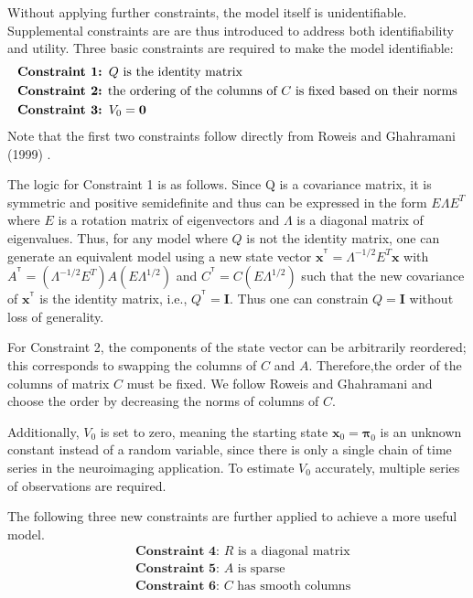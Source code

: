 \documentclass[fleqn]{article}
\newcommand{\T}{^{\ensuremath{\mathsf{T}}}}           %
\providecommand{\mb}[1]{\boldsymbol{#1}}
\newcommand{\bx}{\mb{x}}
\begin{document}
Without applying further constraints, the model itself is unidentifiable. Supplemental constraints are are thus introduced to address both identifiability and utility. Three basic constraints are required to make the model identifiable:
\vspace*{-3mm}
\begin{equation*}\label{eq:constraints1}
\begin{aligned}
&\textbf{Constraint 1: }Q \text{ is the identity matrix}\\
&\text{\textbf{Constraint 2:} the ordering of the columns of } C \text{ is fixed based on their norms}\\
&\textbf{Constraint 3: } V_0=\mathbf{0}
\end{aligned}
\end{equation*}
Note that the first two constraints follow directly from Roweis and Ghahramani (1999) \cite{roweis1999unifying}.

The logic for Constraint 1 is as follows. Since Q is a covariance matrix, it is symmetric and positive semidefinite and thus can be expressed in the form $E\Lambda E^T$ where $E$ is a rotation matrix of eigenvectors and $\Lambda$ is a diagonal matrix of eigenvalues. Thus, for any model where $Q$ is not the identity matrix, one can generate an equivalent model using a new state vector $\bx^{\T}=\Lambda^{-1/2} E^T \bx$ with $A^{\T}=(\Lambda^{-1/2}E^T)A(E\Lambda^{1/2})$ and $C^{\T}=C(E\Lambda^{1/2})$ such that the new covariance of $\bx^{\T}$ is the identity matrix, i.e., $Q^{\T}=\mathbf{I}$. Thus one can constrain $Q=\mathbf{I}$ without loss of generality.

For Constraint 2, the components of the state vector can be arbitrarily reordered; this corresponds to swapping the columns of $C$ and $A$. Therefore,the order of the columns of matrix $C$ must be fixed. We follow Roweis and Ghahramani and choose the order by decreasing the norms of columns of $C$.

Additionally, $V_0$ is set to zero, meaning the starting state $\bx_0=\mathbf{\pi}_0$ is an unknown constant instead of a random variable, since there is only a single chain of time series in the neuroimaging application. To estimate $V_0$ accurately, multiple series of observations are required.

The following three new constraints are further applied to achieve a more useful model.
\vspace*{-3mm}
\begin{equation*}\label{eqn:constraints2}
\begin{aligned}
&\textbf{Constraint 4: }R\text{ is a diagonal matrix}\\
&\textbf{Constraint 5: }A\text{ is sparse}\\
&\textbf{Constraint 6: }C\text{ has smooth columns}
\end{aligned}
\end{equation*}
\end{document}
